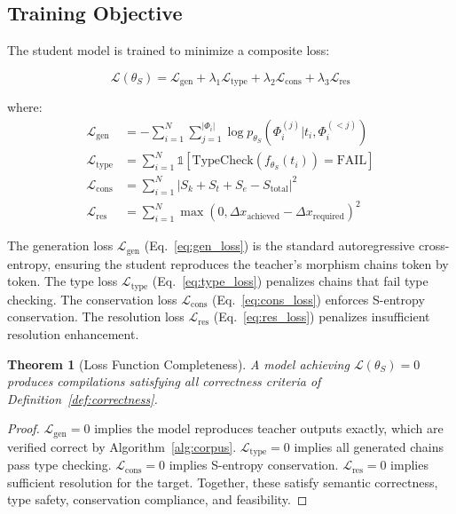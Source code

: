 \documentclass[11pt,a4paper]{article}
\newtheorem{theorem}{Theorem}[section]
\theoremstyle{definition}
\theoremstyle{remark}
\newcommand{\Sk}{S_k}
\newcommand{\St}{S_t}
\newcommand{\Se}{S_e}
\newcommand{\morphism}{\Phi}
\newcommand{\loss}{\mathcal{L}}
\newcommand{\params}{\theta}
\begin{document}
\subsection{Training Objective}

The student model is trained to minimize a composite loss:

\begin{equation}
\loss(\params_S) = \loss_{\text{gen}} + \lambda_1 \loss_{\text{type}} + \lambda_2 \loss_{\text{cons}} + \lambda_3 \loss_{\text{res}}
\end{equation}

where:
\begin{align}
\loss_{\text{gen}} &= -\sum_{i=1}^{N} \sum_{j=1}^{|\morphism_i|} \log p_{\params_S}(\morphism_i^{(j)} | t_i, \morphism_i^{(<j)}) \label{eq:gen_loss} \\
\loss_{\text{type}} &= \sum_{i=1}^{N} \mathbb{1}[\text{TypeCheck}(f_{\params_S}(t_i)) = \text{FAIL}] \label{eq:type_loss} \\
\loss_{\text{cons}} &= \sum_{i=1}^{N} |\Sk + \St + \Se - S_{\text{total}}|^2 \label{eq:cons_loss} \\
\loss_{\text{res}} &= \sum_{i=1}^{N} \max(0, \Delta x_{\text{achieved}} - \Delta x_{\text{required}})^2 \label{eq:res_loss}
\end{align}

The generation loss $\loss_{\text{gen}}$ (Eq.~\ref{eq:gen_loss}) is the standard autoregressive cross-entropy, ensuring the student reproduces the teacher's morphism chains token by token. The type loss $\loss_{\text{type}}$ (Eq.~\ref{eq:type_loss}) penalizes chains that fail type checking. The conservation loss $\loss_{\text{cons}}$ (Eq.~\ref{eq:cons_loss}) enforces S-entropy conservation. The resolution loss $\loss_{\text{res}}$ (Eq.~\ref{eq:res_loss}) penalizes insufficient resolution enhancement.

\begin{theorem}[Loss Function Completeness]
\label{thm:loss_complete}
A model achieving $\loss(\params_S) = 0$ produces compilations satisfying all correctness criteria of Definition~\ref{def:correctness}.
\end{theorem}

\begin{proof}
$\loss_{\text{gen}} = 0$ implies the model reproduces teacher outputs exactly, which are verified correct by Algorithm~\ref{alg:corpus}. $\loss_{\text{type}} = 0$ implies all generated chains pass type checking. $\loss_{\text{cons}} = 0$ implies S-entropy conservation. $\loss_{\text{res}} = 0$ implies sufficient resolution for the target. Together, these satisfy semantic correctness, type safety, conservation compliance, and feasibility.
\end{proof}
\end{document}
